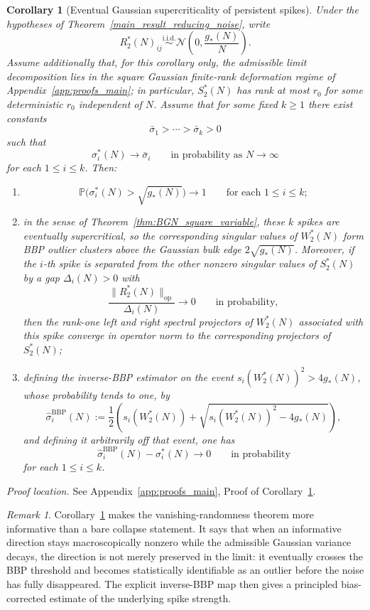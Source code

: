 \documentclass[11pt]{article}
\theoremstyle{plain}
\newtheorem{cor}[thm]{Corollary}
\theoremstyle{definition}
\theoremstyle{remark}
\newtheorem{rem}[thm]{Remark}
\newcommand{\PP}{\mathbb{P}}
\newcommand{\op}{\mathrm{op}}
\newcommand{\1}{\mathbf{1}}
\newcommand{\proofloc}[1]{\par\noindent\emph{Proof location.} #1\par}
\begin{document}
\begin{cor}[Eventual Gaussian supercriticality of persistent spikes]
\label{cor:gaussian_BBP_persistent_spikes}
Under the hypotheses of Theorem~\ref{main_result_reducing_noise}, write
\[
R_2^*(N)_{ij}\overset{\mathrm{i.i.d.}}{\sim}
\mathcal N\!\left(0,\frac{g_*(N)}{N}\right).
\]
Assume additionally that, for this corollary only, the admissible limit decomposition lies in the square Gaussian finite-rank deformation regime of Appendix~\ref{app:proofs_main}; in particular, \(S_2^*(N)\) has rank at most \(r_0\) for some deterministic \(r_0\) independent of \(N\).
Assume that for some fixed \(k\ge1\) there exist constants
\[
\bar\sigma_1>\cdots>\bar\sigma_k>0
\]
such that
\[
\sigma_i^*(N)\to \bar\sigma_i
\qquad\text{in probability as }N\to\infty
\]
for each \(1\le i\le k\). Then:
\begin{enumerate}[leftmargin=2em]
\item
\[
\PP\!\big(\sigma_i^*(N)>\sqrt{g_*(N)}\big)\to1
\qquad\text{for each }1\le i\le k;
\]
\item in the sense of Theorem~\ref{thm:BGN_square_variable}, these \(k\) spikes are eventually supercritical, so the corresponding singular values of \(W_2^*(N)\) form BBP outlier clusters above the Gaussian bulk edge \(2\sqrt{g_*(N)}\). Moreover, if the \(i\)-th spike is separated from the other nonzero singular values of \(S_2^*(N)\) by a gap \(\Delta_i(N)>0\) with
\[
\frac{\|R_2^*(N)\|_{\op}}{\Delta_i(N)}\to0
\qquad\text{in probability},
\]
then the rank-one left and right spectral projectors of \(W_2^*(N)\) associated with this spike converge in operator norm to the corresponding projectors of \(S_2^*(N)\);
\item defining the inverse-BBP estimator on the event \(s_i(W_2^*(N))^2>4g_*(N)\), whose probability tends to one, by
\[
\widehat\sigma_i^{\mathrm{BBP}}(N)
:=
\frac12\left(
s_i(W_2^*(N))
+
\sqrt{s_i(W_2^*(N))^2-4g_*(N)}
\right),
\]
and defining it arbitrarily off that event,
one has
\[
\widehat\sigma_i^{\mathrm{BBP}}(N)-\sigma_i^*(N)\to0
\qquad\text{in probability}
\]
for each \(1\le i\le k\).
\end{enumerate}
\end{cor}
\proofloc{See Appendix~\ref{app:proofs_main}, Proof of Corollary~\ref{cor:gaussian_BBP_persistent_spikes}.}

\begin{rem}
Corollary~\ref{cor:gaussian_BBP_persistent_spikes} makes the vanishing-randomness theorem more informative than a bare collapse statement. It says that when an informative direction stays macroscopically nonzero while the admissible Gaussian variance decays, the direction is not merely preserved in the limit: it eventually crosses the BBP threshold and becomes statistically identifiable as an outlier before the noise has fully disappeared. The explicit inverse-BBP map then gives a principled bias-corrected estimate of the underlying spike strength.
\end{rem}
\end{document}
